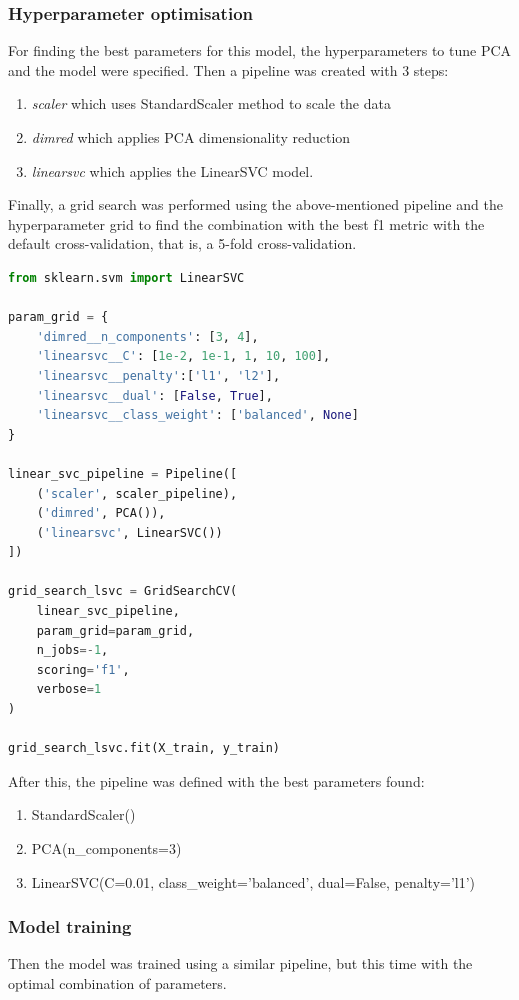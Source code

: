 \documentclass{article}
\begin{document}
\subsubsection{Hyperparameter optimisation}
For finding the best parameters for this model, the hyperparameters to tune PCA and the model were specified. Then a pipeline was created with 3 steps:
\begin{enumerate}
\item \emph{scaler} which uses StandardScaler method to scale the data
\item \emph{dimred} which applies PCA dimensionality reduction
\item \emph{linearsvc} which applies the LinearSVC model.
\end{enumerate}

Finally, a grid search was performed using the above-mentioned pipeline and the hyperparameter grid to find the combination with the best f1 metric with the default cross-validation, that is, a 5-fold cross-validation.
\begin{lstlisting}[language=Python]
from sklearn.svm import LinearSVC

param_grid = {
    'dimred__n_components': [3, 4], 
    'linearsvc__C': [1e-2, 1e-1, 1, 10, 100],
    'linearsvc__penalty':['l1', 'l2'],
    'linearsvc__dual': [False, True],
    'linearsvc__class_weight': ['balanced', None]
}

linear_svc_pipeline = Pipeline([
    ('scaler', scaler_pipeline), 
    ('dimred', PCA()), 
    ('linearsvc', LinearSVC())
])

grid_search_lsvc = GridSearchCV(
    linear_svc_pipeline,
    param_grid=param_grid,
    n_jobs=-1,
    scoring='f1',
    verbose=1
)

grid_search_lsvc.fit(X_train, y_train)
\end{lstlisting}

After this, the pipeline was defined with the best parameters found:
\begin{enumerate}
    \item StandardScaler()
    \item PCA(n\_components=3)
    \item LinearSVC(C=0.01, class\_weight='balanced', dual=False, penalty='l1')
\end{enumerate}

\subsubsection{Model training}
Then the model was trained using a similar pipeline, but this time with the optimal combination of parameters.
\end{document}
